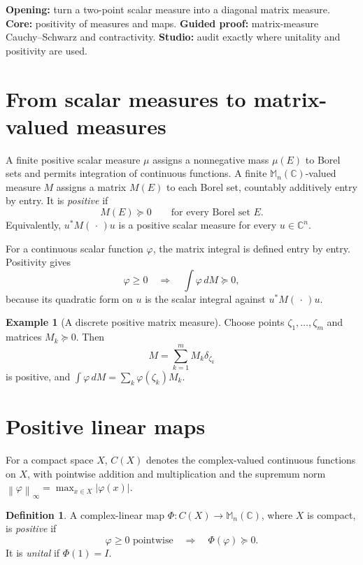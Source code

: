 \documentclass[11pt,oneside,openany]{book}
\theoremstyle{definition}
\newtheorem{definition}[theorem]{Definition}
\newtheorem{example}[theorem]{Example}
\theoremstyle{remark}
\newcommand{\C}{\mathbb C}
\newcommand{\Mn}{\mathbb M_n(\C)}
\newcommand{\norm}[1]{\left\lVert #1\right\rVert}
\begin{document}
\begin{workshopplan}
\textbf{Opening:} turn a two-point scalar measure into a diagonal
matrix measure. \textbf{Core:} positivity of measures and maps.
\textbf{Guided proof:} matrix-measure Cauchy--Schwarz and
contractivity. \textbf{Studio:} audit exactly where unitality and
positivity are used.
\end{workshopplan}

\section{From scalar measures to matrix-valued measures}

A finite positive scalar measure \(\mu\) assigns a nonnegative mass
\(\mu(E)\) to Borel sets and permits integration of continuous
functions.  A finite \(\Mn\)-valued measure \(M\) assigns a matrix
\(M(E)\) to each Borel set, countably additively entry by entry.
It is \emph{positive} if
\[
  M(E)\succeq0\qquad\text{for every Borel set }E.
\]
Equivalently, \(u^*M(\,\cdot\,)u\) is a positive scalar measure for
every \(u\in\C^n\).

For a continuous scalar function \(\varphi\), the matrix integral is
defined entry by entry.  Positivity gives
\begin{equation}
  \varphi\geq0
  \quad\Longrightarrow\quad
  \int\varphi\,dM\succeq0,
  \label{eq:positive-integral}
\end{equation}
because its quadratic form on \(u\) is the scalar integral against
\(u^*M(\,\cdot\,)u\).

\begin{example}[A discrete positive matrix measure]
Choose points \(\zeta_1,\ldots,\zeta_m\) and matrices
\(M_k\succeq0\).  Then
\[
  M=\sum_{k=1}^m M_k\delta_{\zeta_k}
\]
is positive, and
\(
\int\varphi\,dM=\sum_k\varphi(\zeta_k)M_k.
\)
\end{example}

\section{Positive linear maps}

For a compact space \(X\), \(C(X)\) denotes the complex-valued
continuous functions on \(X\), with pointwise addition and
multiplication and the supremum norm
\(\norm{\varphi}_\infty=\max_{x\in X}|\varphi(x)|\).

\begin{definition}
A complex-linear map
\(\Phi:C(X)\to\Mn\), where \(X\) is compact, is \emph{positive} if
\[
  \varphi\geq0\text{ pointwise}
  \quad\Longrightarrow\quad
  \Phi(\varphi)\succeq0.
\]
It is \emph{unital} if \(\Phi(1)=I\).
\end{definition}
\end{document}
